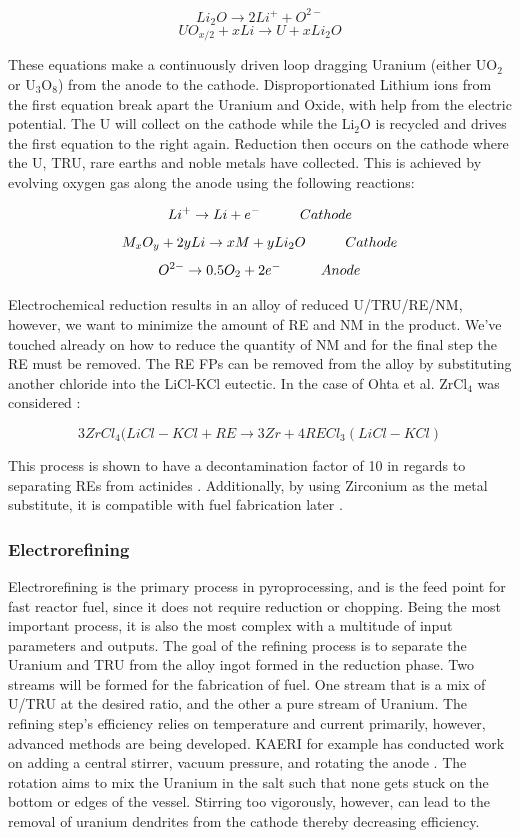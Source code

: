 \[ Li_2O \rightarrow 2Li^+ + O^{2-} \]
\[ UO_{x/2} + xLi \rightarrow U + xLi_2O \]

These equations make a continuously driven loop dragging Uranium (either UO$_2$ or U$_3$O$_8$) from the anode to the cathode. 
Disproportionated Lithium ions from the first equation break apart the Uranium and Oxide, with help from the electric potential.
The U will collect on the cathode while the Li$_2$O is recycled and drives the first equation to the right again. 
Reduction then occurs on the cathode where the U, TRU, rare earths and noble metals have collected.
This is achieved by evolving oxygen gas along the anode using the following reactions\cite{hur_electrochemical_nodate,organisation}:

\[ Li^+ \rightarrow Li + e^- \hspace{10mm} Cathode \]
\[ M_xO_y + 2yLi \rightarrow xM + yLi_2O \hspace{10mm} Cathode \]
\[ O^{2-} \rightarrow 0.5O_2 + 2e^- \hspace{10mm} Anode \]

Electrochemical reduction results in an alloy of reduced U/TRU/RE/NM, however, we want to minimize the amount of RE and NM in the product.
We've touched already on how to reduce the quantity of NM and for the final step the RE must be removed.
The RE FPs can be removed from the alloy by substituting another chloride into the LiCl-KCl eutectic.
In the case of Ohta et al. ZrCl$_4$ was considered \cite{ohta}:

\[ 3ZrCl_4(LiCl-KCl + RE \rightarrow 3Zr + 4RECl_3(LiCl-KCl) \]

This process is shown to have a decontamination factor of 10 in regards to separating REs from actinides \cite{sakamura}. Additionally, by using Zirconium as the metal substitute, it is compatible with fuel fabrication later \cite{ohta}.
\subsubsection{Electrorefining}
Electrorefining is the primary process in pyroprocessing, and is the feed point for fast reactor fuel, since it does not require reduction or chopping.
Being the most important process, it is also the most complex with a multitude of input parameters and outputs. 
The goal of the refining process is to separate the Uranium and TRU from the alloy ingot formed in the reduction phase.
Two streams will be formed for the fabrication of fuel. One stream that is a mix of U/TRU at the desired ratio, and the other a pure stream of Uranium.
The refining step's efficiency relies on temperature and current primarily, however, advanced methods are being developed.
KAERI for example has conducted work on adding a central stirrer, vacuum pressure, and rotating the anode \cite{lee_advanced}.
The rotation aims to mix the Uranium in the salt such that none gets stuck on the bottom or edges of the vessel. 
Stirring too vigorously, however, can lead to the removal of uranium dendrites from the cathode thereby decreasing efficiency.\\

